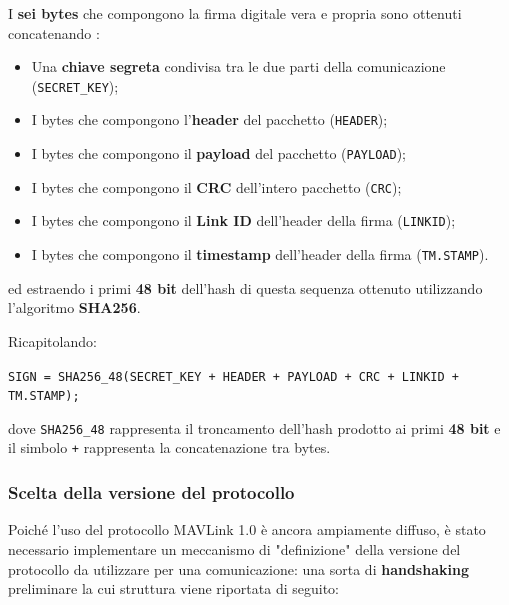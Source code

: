 \documentclass[a4paper, 12pt, oneside]{article}
\theoremstyle{definition}
\begin{document}
I \textbf{sei bytes} che compongono la firma digitale vera e propria sono ottenuti concatenando \cite{sign-algorithm}:

\begin{itemize}
    \item Una \textbf{chiave segreta} condivisa tra le due parti della comunicazione (\texttt{SECRET\_KEY});
    \item I bytes che compongono l'\textbf{header} del pacchetto (\texttt{HEADER});
    \item I bytes che compongono il \textbf{payload} del pacchetto (\texttt{PAYLOAD});
    \item I bytes che compongono il \textbf{CRC} dell'intero pacchetto (\texttt{CRC});
    \item I bytes che compongono il \textbf{Link ID} dell'header della firma (\texttt{LINKID});
    \item I bytes che compongono il \textbf{timestamp} dell'header della firma (\texttt{TM.STAMP}).
\end{itemize}

ed estraendo i primi \textbf{48 bit} dell'hash di questa sequenza ottenuto utilizzando l'algoritmo \textbf{SHA256}.

Ricapitolando:

\begin{center}
    \texttt{SIGN = SHA256\_48(SECRET\_KEY + HEADER + PAYLOAD + CRC + LINKID + TM.STAMP);}
\end{center}

dove \texttt{SHA256\_48} rappresenta il troncamento dell'hash prodotto ai primi \textbf{48 bit} e il simbolo \texttt{+} rappresenta la concatenazione tra bytes.

\newpage
\subsubsection{Scelta della versione del protocollo}
Poiché l'uso del protocollo MAVLink 1.0 è ancora ampiamente diffuso, è stato necessario implementare un meccanismo di "definizione" della versione del protocollo da utilizzare per una comunicazione: una sorta di \textbf{handshaking} \cite{version-handshaking} preliminare la cui struttura viene riportata di seguito:
\end{document}
